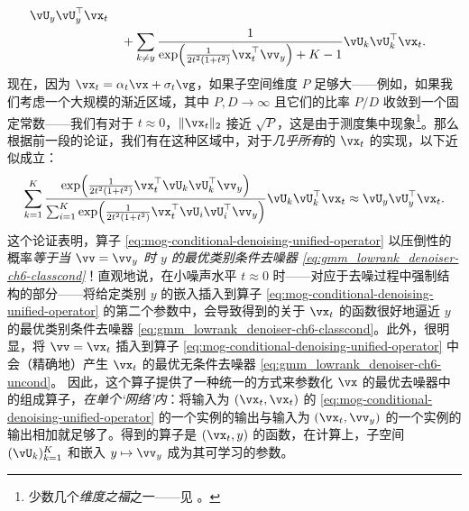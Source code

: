 \documentclass[../../book-main.tex]{subfiles}
\begin{document}
\begin{example}
\begin{align}
\begin{split}
{    }
    \vU_{y}\vU_{y}^{\top}\vx_t
    \\
    &\quad+
    \sum_{k \neq y}
    \frac{
      1
    }
    {
      \exp\rp{\frac{1}{2t^{2}(1
      + t^{2})}\vx_t^\top \vv_y}
      + K-1
    }
    \vU_{k}\vU_{k}^{\top}\vx_t.
    \end{split}
  \end{align}
  现在，因为 $\vx_t = \alpha_t \vx + \sigma_t \vg$，如果子空间维度 $P$ 足够大——例如，如果我们考虑一个大规模的渐近区域，其中 $P, D \to \infty$ 且它们的比率 $P/D$ 收敛到一个固定常数——我们有对于 $t \approx 0$，$\norm{\vx_t}_2$ 接近 $\sqrt{P}$，这是由于测度集中现象\footnote{少数几个\textit{维度之福}之一——见 \textcite{Wright-Ma-2022}。}。那么
  根据前一段的论证，我们有在这种区域中，对于\textit{几乎所有}的 $\vx_t$ 的实现，以下近似成立：
  \begin{equation}
    \sum_{k = 1}^{K}
    \frac{
      \exp\rp{\frac{1}{2t^{2}(1
      + t^{2})}\vx_t^\top \vU_k \vU_k^\top \vv_y}
    }
    {
      \sum_{i
      = 1}^{K}\exp\rp{\frac{1}{2t^{2}(1
      + t^{2})}\vx_t^\top \vU_i \vU_i^\top \vv_y}
    }
    \vU_{k}\vU_{k}^{\top}\vx_t
    \approx
    \vU_{y}\vU_{y}^{\top}\vx_t.
  \end{equation}
  这个论证表明，算子 \eqref{eq:mog-conditional-denoising-unified-operator} 以压倒性的概率\textit{等于当 $\vv = \vv_y$ 时 $y$ 的最优类别条件去噪器 \eqref{eq:gmm_lowrank_denoiser-ch6-classcond}}！直观地说，在小噪声水平 $t \approx 0$ 时——对应于去噪过程中强制结构的部分——将给定类别 $y$ 的嵌入插入到算子 \eqref{eq:mog-conditional-denoising-unified-operator} 的第二个参数中，会导致得到的关于 $\vx_t$ 的函数很好地逼近 $y$ 的最优类别条件去噪器 \eqref{eq:gmm_lowrank_denoiser-ch6-classcond}。此外，很明显，将 $\vv = \vx_t$ 插入到算子 \eqref{eq:mog-conditional-denoising-unified-operator} 中会（精确地）产生 $\vx_t$ 的最优无条件去噪器 \eqref{eq:gmm_lowrank_denoiser-ch6-uncond}。
  因此，这个算子提供了一种统一的方式来参数化 $\vx$ 的最优去噪器中的组成算子，\textit{在单个‘网络’内}：将输入为 $(\vx_t, \vx_t)$ 的 \eqref{eq:mog-conditional-denoising-unified-operator} 的一个实例的输出与输入为 $(\vx_t, \vv_y)$ 的一个实例的输出相加就足够了。得到的算子是 $(\vx_t, y)$ 的函数，在计算上，子空间 $(\vU_k)_{k=1}^K$ 和嵌入 $y \mapsto \vv_y$ 成为其可学习的参数。
\end{example}
\end{document}
